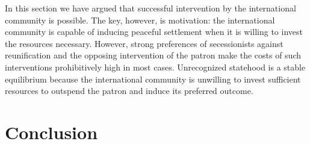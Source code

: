 \documentclass[12pt,letterpaper, notitlepage]{article}
\begin{document}
In this section we have argued that successful intervention by the international community is possible. The key, however, is motivation: the international community is capable of inducing peaceful settlement when it is willing to invest the resources necessary. However, strong preferences of secessionists against reunification and the opposing intervention of the patron make the costs of such interventions prohibitively high in most cases.  Unrecognized statehood is a stable equilibrium because the international community is unwilling to invest sufficient resources to outspend the patron and induce its preferred outcome.


\section*{Conclusion}
\end{document}
